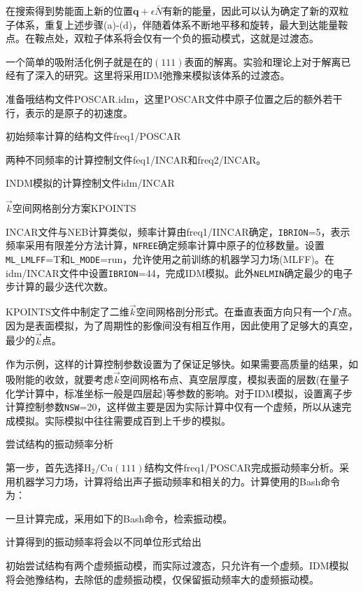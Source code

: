 在搜索得到势能面上新的位置$\mathbf{q}+\epsilon\bar{N}$有新的能量，因此可以认为确定了新的双粒子体系，重复上述步骤(a)-(d)，伴随着体系不断地平移和旋转，最大到达能量鞍点。在鞍点处，双粒子体系将会仅有一个负的振动模式，这就是过渡态。

一个简单的吸附活化例子就是在的$(111)$表面的解离。实验和理论上对于解离已经有了深入的研究。这里将采用\textrm{IDM}弛豫来模拟该体系的过渡态。

准备哦结构文件\textrm{POSCAR.idm}，这里\textrm{POSCAR}文件中原子位置之后的额外若干行，表示的是原子的初速度。

初始频率计算的结构文件\textrm{freq1/POSCAR}

两种不同频率的计算控制文件\textrm{feq1/INCAR}和\textrm{freq2/INCAR}。

\textrm{INDM}模拟的计算控制文件\textrm{idm/INCAR}

$\vec k$空间网格剖分方案\textrm{KPOINTS}

\textrm{INCAR}文件与\textrm{NEB}计算类似，频率计算由\textrm{freq1/IINCAR}确定，\texttt{IBRION}=5，表示频率采用有限差分方法计算，\texttt{NFREE}确定频率计算中原子的位移数量。设置\texttt{ML\_LMLFF}=\textrm{T}和\texttt{L\_MODE}=\textrm{run}，允许使用之前训练的机器学习力场\textrm{(MLFF)}。在\textrm{idm/INCAR}文件中设置\texttt{IBRION}=44，完成\textrm{IDM}模拟。此外\texttt{NELMIN}确定最少的电子步计算的最少迭代次数。

\textrm{KPOINTS}文件中制定了二维$\vec k$空间网格剖分形式。在垂直表面方向只有一个$\Gamma$点。因为是表面模拟，为了周期性的影像间没有相互作用，因此使用了足够大的真空，最少的$\vec k$点。

作为示例，这样的计算控制参数设置为了保证足够快。如果需要高质量的结果，如吸附能的收敛，就要考虑$\vec k$空间网格布点、真空层厚度，模拟表面的层数(在量子化学计算中，标准坐标一般是四层起)等参数的影响。对于\textrm{IDM}模拟，设置离子步计算控制参数\texttt{NSW}=20，这样做主要是因为实际计算中仅有一个虚频，所以从速完成模拟。实际模拟中往往需要成百到上千步的模拟。

尝试结构的振动频率分析

第一步，首先选择$\mathrm{H}_2/\mathrm{Cu}(111)$结构文件\textrm{freq1/POSCAR}完成振动频率分析。采用机器学习力场，计算将给出声子振动频率和相关的力。计算使用的\textrm{Bash}命令为：

一旦计算完成，采用如下的\textrm{Bash}命令，检索振动模。

计算得到的振动频率将会以不同单位形式给出

初始尝试结构有两个虚频振动模，而实际过渡态，只允许有一个虚频。\textrm{IDM}模拟将会弛豫结构，去除低的虚频振动模，仅保留振动频率大的虚频振动模。

